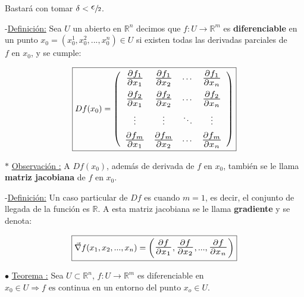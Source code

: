 \documentclass[10pt, titlepage]{article}
\newcommand{\R}{\mathbb{R}}
\newcommand{\bfrac}[2]{\scalebox{1.4}{$\frac{#1}{#2}$}}
\newcommand{\definicion}{\noindent-\underline{Definición:} }
\newcommand{\teorema}[1][\!\!]{\noindent$\bullet$ \underline{Teorema #1:} }
\newcommand{\observacion}[1][\!\!]{\noindent$\ast$ \underline{Observación #1:} }
\begin{document}
Bastará con tomar $\delta < \sfrac{\scalebox{1.5}{$\epsilon$}}{2}$.
\vspace{7mm}


\definicion Sea $U$ un abierto en $\R^n$ decimos que $f : U  \to \R^m$ es \textbf{diferenciable} en un 
punto $x_0 = (x_0^1, x_0^2,..., x_0^n) \in U$ si existen todas las derivadas parciales de $f \text{ en } x_0$, 
y se cumple:
\vspace{3mm}

\[
\boxed{
Df(x_0) = 
\left ( \begin{array}{cccc}

\bfrac{\partial f_1}{\partial x_1} & \bfrac{\partial f_1}{\partial x_2} & \cdots & \bfrac{\partial f_1}{\partial 
x_n}\vspace{2mm}\\
\bfrac{\partial f_2}{\partial x_1} & \bfrac{\partial f_2}{\partial x_2} & \cdots & \bfrac{\partial f_2}{\partial 
x_n}\vspace{2mm}\\
\vdots & \vdots & \ddots & \vdots\vspace{2mm}\\
\bfrac{\partial f_m}{\partial x_1} & \bfrac{\partial f_m}{\partial x_2} & \cdots & \bfrac{\partial f_m}{\partial 
x_n}\\

\end{array} \right )
}
\]
\vspace{7mm}

\observacion A $Df (x_0)$, además de derivada de $f \text{ en } x_0$, también se le llama \textbf{matriz 
jacobiana} de $f \text{ en } x_0$.
\vspace{7mm}


\definicion Un caso particular de $Df$ es cuando $m = 1$, es decir, el conjunto de llegada de la función es 
$\R$. A esta matriz jacobiana se le llama \textbf{gradiente} y se denota:
\vspace{2mm}

\[
\boxed{
\vec{\nabla} f (x_1, x_2,..., x_n) = \left ( \bfrac{\partial f}{\partial x_1}, \bfrac{\partial f}{\partial x_2},..., 
\bfrac{\partial f}{\partial x_n}\right )
}
\]
\vspace{5mm}


\teorema Sea $U \subset \R^n$, $f : U \to \R^m$ es diferenciable en $x_0 \in U \Rightarrow f \text{ es 
continua en un entorno del punto } x_o \in U$.
\vspace{3mm}
\end{document}
